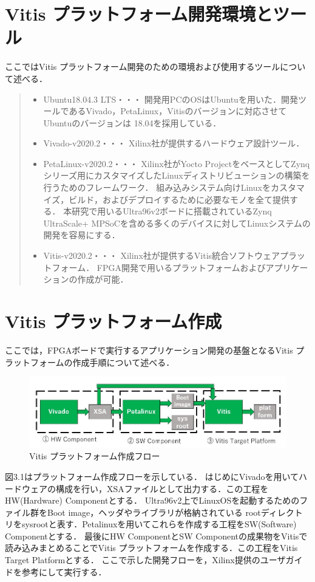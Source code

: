 \documentclass[11pt,a4j]{jreport}
\begin{document}
\section{Vitis プラットフォーム開発環境とツール}
ここではVitis プラットフォーム開発のための環境および使用するツールについて述べる．
\begin{quote}
  \begin{itemize}
    \item Ubuntu18.04.3 LTS・・・
    開発用PCのOSはUbuntuを用いた．開発ツールであるVivado，PetaLinux，Vitisのバージョンに対応させてUbuntuのバージョンは
    18.04を採用している．
    \item Vivado-v2020.2・・・
    Xilinx社が提供するハードウェア設計ツール．
    \item PetaLinux-v2020.2・・・
    Xilinx社がYocto ProjectをベースとしてZynqシリーズ用にカスタマイズしたLinuxディストリビューションの構築を行うためのフレームワーク．
    組み込みシステム向けLinuxをカスタマイズ，ビルド，およびデプロイするために必要なモノを全て提供する．
    本研究で用いるUltra96v2ボードに搭載されているZynq UltraScale+ MPSoCを含める多くのデバイスに対してLinuxシステムの開発を容易にする．
    \item Vitis-v2020.2・・・
    Xilinx社が提供するVitis統合ソフトウェアプラットフォーム．
    FPGA開発で用いるプラットフォームおよびアプリケーションの作成が可能．
  \end{itemize}
\end{quote}

\section{Vitis プラットフォーム作成}
ここでは，FPGAボードで実行するアプリケーション開発の基盤となるVitis プラットフォームの作成手順について述べる．
\begin{figure}[H]
  \center
  \includegraphics[scale = 0.8]{pict/pict7.jpg}
  \caption{Vitis プラットフォーム作成フロー}
\end{figure}
図3.1はプラットフォーム作成フローを示している．
はじめにVivadoを用いてハードウェアの構成を行い，XSAファイルとして出力する．この工程をHW(Hardware) Componentとする．
Ultra96v2上でLinuxOSを起動するためのファイル群をBoot image，ヘッダやライブラリが格納されている
rootディレクトリをsysrootと表す．Petalinuxを用いてこれらを作成する工程をSW(Software) Componentとする．
最後にHW ComponentとSW Componentの成果物をVitisで読み込みまとめることでVitis プラットフォームを作成する．この工程をVitis Target Platformとする．
ここで示した開発フローを，Xilinx提供のユーザガイド\cite{Xilinx-platform}を参考にして実行する．
\end{document}
